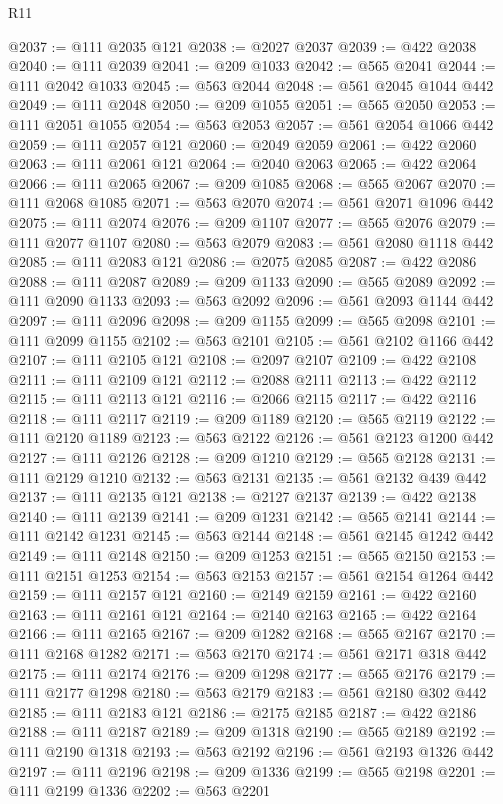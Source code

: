 \begin{lexlean}{R11}
\begin{coremodule}
@2037 := @111 @2035 @121
@2038 := @2027 @2037
@2039 := @422 @2038
@2040 := @111 @2039
@2041 := @209 @1033
@2042 := @565 @2041
@2044 := @111 @2042 @1033
@2045 := @563 @2044
@2048 := @561 @2045 @1044 @442
@2049 := @111 @2048
@2050 := @209 @1055
@2051 := @565 @2050
@2053 := @111 @2051 @1055
@2054 := @563 @2053
@2057 := @561 @2054 @1066 @442
@2059 := @111 @2057 @121
@2060 := @2049 @2059
@2061 := @422 @2060
@2063 := @111 @2061 @121
@2064 := @2040 @2063
@2065 := @422 @2064
@2066 := @111 @2065
@2067 := @209 @1085
@2068 := @565 @2067
@2070 := @111 @2068 @1085
@2071 := @563 @2070
@2074 := @561 @2071 @1096 @442
@2075 := @111 @2074
@2076 := @209 @1107
@2077 := @565 @2076
@2079 := @111 @2077 @1107
@2080 := @563 @2079
@2083 := @561 @2080 @1118 @442
@2085 := @111 @2083 @121
@2086 := @2075 @2085
@2087 := @422 @2086
@2088 := @111 @2087
@2089 := @209 @1133
@2090 := @565 @2089
@2092 := @111 @2090 @1133
@2093 := @563 @2092
@2096 := @561 @2093 @1144 @442
@2097 := @111 @2096
@2098 := @209 @1155
@2099 := @565 @2098
@2101 := @111 @2099 @1155
@2102 := @563 @2101
@2105 := @561 @2102 @1166 @442
@2107 := @111 @2105 @121
@2108 := @2097 @2107
@2109 := @422 @2108
@2111 := @111 @2109 @121
@2112 := @2088 @2111
@2113 := @422 @2112
@2115 := @111 @2113 @121
@2116 := @2066 @2115
@2117 := @422 @2116
@2118 := @111 @2117
@2119 := @209 @1189
@2120 := @565 @2119
@2122 := @111 @2120 @1189
@2123 := @563 @2122
@2126 := @561 @2123 @1200 @442
@2127 := @111 @2126
@2128 := @209 @1210
@2129 := @565 @2128
@2131 := @111 @2129 @1210
@2132 := @563 @2131
@2135 := @561 @2132 @439 @442
@2137 := @111 @2135 @121
@2138 := @2127 @2137
@2139 := @422 @2138
@2140 := @111 @2139
@2141 := @209 @1231
@2142 := @565 @2141
@2144 := @111 @2142 @1231
@2145 := @563 @2144
@2148 := @561 @2145 @1242 @442
@2149 := @111 @2148
@2150 := @209 @1253
@2151 := @565 @2150
@2153 := @111 @2151 @1253
@2154 := @563 @2153
@2157 := @561 @2154 @1264 @442
@2159 := @111 @2157 @121
@2160 := @2149 @2159
@2161 := @422 @2160
@2163 := @111 @2161 @121
@2164 := @2140 @2163
@2165 := @422 @2164
@2166 := @111 @2165
@2167 := @209 @1282
@2168 := @565 @2167
@2170 := @111 @2168 @1282
@2171 := @563 @2170
@2174 := @561 @2171 @318 @442
@2175 := @111 @2174
@2176 := @209 @1298
@2177 := @565 @2176
@2179 := @111 @2177 @1298
@2180 := @563 @2179
@2183 := @561 @2180 @302 @442
@2185 := @111 @2183 @121
@2186 := @2175 @2185
@2187 := @422 @2186
@2188 := @111 @2187
@2189 := @209 @1318
@2190 := @565 @2189
@2192 := @111 @2190 @1318
@2193 := @563 @2192
@2196 := @561 @2193 @1326 @442
@2197 := @111 @2196
@2198 := @209 @1336
@2199 := @565 @2198
@2201 := @111 @2199 @1336
@2202 := @563 @2201

\end{coremodule}
\end{lexlean}
